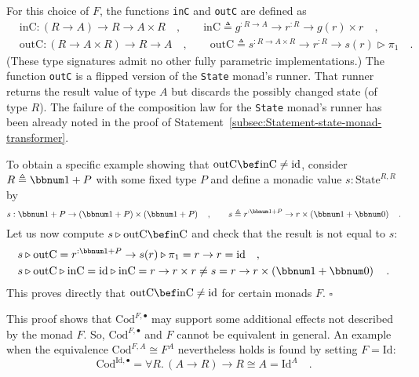 For this choice of $F$, the functions \lstinline!inC! and \lstinline!outC!
are defined as
\begin{align*}
 & \text{inC}:\left(R\rightarrow A\right)\rightarrow R\rightarrow A\times R\quad,\quad\quad\text{inC}\triangleq g^{:R\rightarrow A}\rightarrow r^{:R}\rightarrow g(r)\times r\quad,\\
 & \text{outC}:\left(R\rightarrow A\times R\right)\rightarrow R\rightarrow A\quad,\quad\quad\text{outC}\triangleq s^{:R\rightarrow A\times R}\rightarrow r^{:R}\rightarrow s(r)\triangleright\pi_{1}\quad.
\end{align*}
(These type signatures admit no other fully parametric implementations.)
The function \lstinline!outC! is a flipped version of the \lstinline!State!
monad\textsf{'}s runner. That runner returns the result value of type $A$
but discards the possibly changed state (of type $R$). The failure
of the composition law for the \lstinline!State! monad\textsf{'}s runner has
been already noted in the proof of Statement~\ref{subsec:Statement-state-monad-transformer}.

To obtain a specific example showing that $\text{outC}\bef\text{inC}\neq\text{id}$,
consider $R\triangleq\bbnum 1+P$ with some fixed type $P$ and define
a monadic value $s:\text{State}^{R,R}$ by 
\[
s:\bbnum 1+P\rightarrow\left(\bbnum 1+P\right)\times\left(\bbnum 1+P\right)\quad,\quad\quad s\triangleq r^{:\bbnum 1+P}\rightarrow r\times\left(\bbnum 1+\bbnum 0\right)\quad.
\]
Let us now compute $s\triangleright\text{outC}\bef\text{inC}$ and
check that the result is not equal to $s$:
\begin{align*}
 & s\triangleright\text{outC}=r^{:\bbnum 1+P}\rightarrow s(r)\triangleright\pi_{1}=r\rightarrow r=\text{id}\quad,\\
 & s\triangleright\text{outC}\triangleright\text{inC}=\text{id}\triangleright\text{inC}=r\rightarrow r\times r\neq s=r\rightarrow r\times\left(\bbnum 1+\bbnum 0\right)\quad.
\end{align*}
This proves directly that $\text{outC}\bef\text{inC}\neq\text{id}$
for certain monads $F$. $\square$

This proof shows that $\text{Cod}^{F,\bullet}$ may support some additional
effects not described by the monad $F$. So, $\text{Cod}^{F,\bullet}$
and $F$ cannot be equivalent in general. An example when the equivalence
$\text{Cod}^{F,A}\cong F^{A}$ nevertheless holds is found by setting
$F=\text{Id}$:
\[
\text{Cod}^{\text{Id},\bullet}=\forall R.\,(A\rightarrow R)\rightarrow R\cong A=\text{Id}^{A}\quad.
\]


